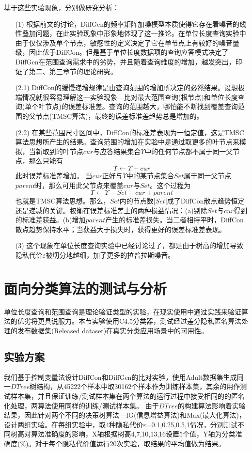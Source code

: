 基于这些实验现象，分别做研究分析：
\begin{enumerate}
	\item[(1)]根据前文的讨论，DiffGen的频率矩阵加噪模型本质使得它存在着噪音的线性叠加问题，在此实验现象中形象地体现了这一推论。在单位长度查询实验中由于仅仅涉及单个节点，敏感性的定义决定了它在单节点上有较好的噪音量级，因此优于DiffCon。但是基于单位长度数据项的查询应答模式决定了DiffGen在范围查询需求中的劣势，并且随着查询维度的增加，越发突出，印证了第二、第三章节的理论研究。
	\item[(2.1)]DiffCon的缓慢递增规律是由查询范围的增加所决定的必然结果。设想极端情况就很容易理解这一实验现象---比对最大范围查询(根节点)和单位长度查询(单个叶节点)的误差标准差。查询的范围越大，哪怕能不断找到覆盖查询范围的父节点(TMSC算法)，最终的误差标准差趋势总是增加的。
	\item[(2.2)]在某些范围尺寸区间中，DiffCon的标准差表现为一恒定值，这是TMSC算法思想所产生的结果。查询范围的增加在实验中是通过取更多的叶节点来模拟，当新取到的叶节点$cur$与应答结果集合$\Upsilon$中的任何节点都不属于同一父节点，那么只能有
	\[
	\Upsilon \leftarrow \Upsilon + cur
	\]
	此时误差标准差增加。
	当$cur$正好与$\Upsilon$中的某节点集合$Set$属于同一父节点$parent$时，那么可用此父节点来覆盖$cur$与$Set$。这个过程为
	\[
	\Upsilon \leftarrow \Upsilon - Set - cur + parent
	\]
	也就是TMSC算法思想。那么，$Set$内的节点数|$Set$|成了DiffCon散点趋势恒定还是递减的关键。权衡在误差标准差上的两种损益情况：(a)剔除$Set$与$cur$得到的标准差获益。(b)增加$parent$产生的标准差损失。当二者相持平时，DiffCon散点趋势保持水平；当获益大于损失时，获得更好的误差标准差表现。
	\item[(3)]这个现象在单位长度查询实验中已经讨论过了，都是由于树高的增加导致隐私代价$\varepsilon$被切分地越细，加了更多的拉普拉斯噪音。
\end{enumerate}

\section{面向分类算法的测试与分析}

单位长度查询和范围查询是理论验证类型的实验，在现实使用中通过实践来验证算法的优劣将更具说服力。本节实验使用C4.5分类器，测试经过差分隐私匿名算法处理的发布数据集(Released dataset)在真实分类应用场景中的可用性。

\subsection{实验方案}

我们基于控制变量法设计DiffCon和DiffGen的比对实验，使用Adult数据集生成同一$DTree$树结构，从45222个样本中取30162个样本作为训练样本集，其余的用作测试样本集，并且保证训练/测试样本集在两个算法的运行过程中接受相同的的匿名化处理，两算法使用同样的训练/测试样本集。
由于$DTree$的构建算法影响着实验结果，因此针对两个不同的决策树算法---IG(信息增益算法)和Max(最大化算法)，设计两组实验。在每组实验中，取4种隐私代价$\varepsilon$=0.1,0.25,0.5,1情况，分别测试不同树高对算法准确度的影响，X轴根据树高4,7,10,13,16设置5个值，Y轴为分类准确度(\%)。对于每个隐私代价值运行20次实验，取结果的平均值做为结果。

